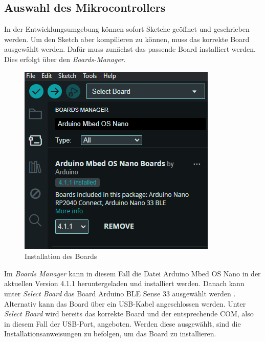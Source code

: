\subsection{Auswahl des Mikrocontrollers}
In der Entwicklungsumgebung können sofort Sketche geöffnet und geschrieben werden. Um den Sketch aber kompilieren zu können, muss das korrekte Board ausgewählt werden.
Dafür muss zunächst das passende Board installiert werden. 
 Dies erfolgt über den \textit{Boards-Manager}.
\begin{figure}[htb]
	\begin{center}
		\includegraphics[width=\textwidth]{General/Boardsmanager}
		\caption{Installation des Boards} \label{Installation des Boards}
	\end{center}
\end{figure}
Im \textit{Boards Manager} kann in diesem Fall die Datei Arduino Mbed OS Nano in der aktuellen Version 4.1.1 heruntergeladen und installiert werden. Danach kann unter \textit{Select Board} das Board Arduino BLE Sense 33 ausgewählt werden \cite{ArdIDE.2024b}.
Alternativ kann das Board über ein USB-Kabel angeschlossen werden. Unter\textit{ Select Board} wird bereits das korrekte Board und der entsprechende COM, also in diesem Fall der USB-Port, angeboten. Werden diese ausgewählt, sind die Installationsanweisungen zu befolgen, um das Board zu installieren.

